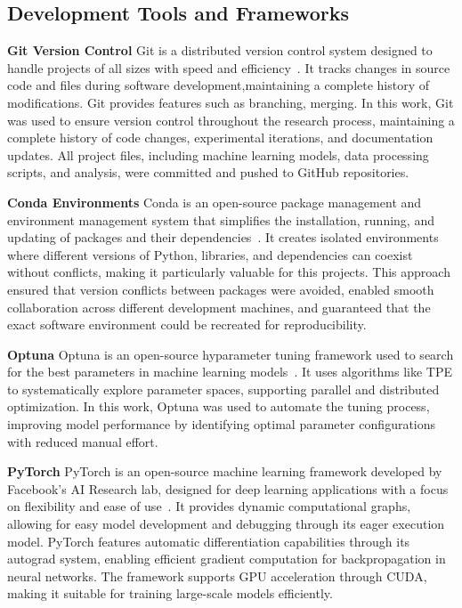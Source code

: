 \subsection{Development Tools and Frameworks}



\textbf{Git Version Control}
Git is a distributed version control system designed to handle projects of all sizes with speed and efficiency~\cite{noauthor_git_nodate}. It tracks changes in source code and files during software development,maintaining a complete history of modifications. Git provides features such as branching, merging. In this work, Git was used to ensure version control throughout the research process, maintaining a complete history of code changes, experimental iterations, and documentation updates. All project files, including machine learning models, data processing scripts, and analysis, were committed and pushed to GitHub repositories.

\textbf{Conda Environments}
Conda is an open-source package management and environment management system that simplifies the installation, running, and updating of packages and 
their dependencies~\cite{conda_contributors_conda_2025}. It creates isolated environments where different versions of Python, libraries, 
and dependencies can coexist without conflicts, making it particularly valuable for this projects. This approach ensured that version conflicts between packages were avoided, enabled smooth collaboration across different 
development machines, and guaranteed that the exact software environment could be recreated for reproducibility.

\textbf{Optuna}
\label{subsec:optuna}
Optuna is an open-source hyparameter tuning framework used to search for the best parameters in machine learning models~\cite{akiba_optuna_2019}. It uses algorithms like TPE to systematically explore parameter spaces, supporting parallel and distributed optimization. In this work, Optuna was used to automate the tuning process, improving model performance by identifying optimal parameter configurations with reduced manual effort.

\textbf{PyTorch}
PyTorch is an open-source machine learning framework developed by Facebook's AI Research lab, designed for deep learning applications with a 
focus on flexibility and ease of use~\cite{ansel_pytorch_2024}. It provides dynamic computational graphs, 
allowing for easy model development and debugging through its eager execution model. PyTorch features 
automatic differentiation capabilities through its autograd system, enabling efficient gradient computation 
for backpropagation in neural networks. The framework supports GPU acceleration through CUDA, making it suitable
for training large-scale models efficiently. 

